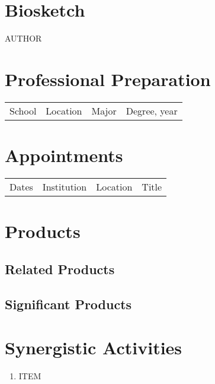 \documentclass[fontsize=10pt,paper=letter,twoside=false,onecolumn,headings=small]{scrartcl} %
\begin{document}
\section*{Biosketch}
{\Large\textsc{AUTHOR}}
\section*{Professional Preparation}
\begin{tabular}{llll}
School & Location & Major & Degree, year \\
\end{tabular}
\section*{Appointments}
\begin{tabular}{llll}
	Dates & Institution & Location & Title 
\end{tabular}
\section*{Products}
\subsection*{Related Products}
\begin{refsection}
\nocite{}
\printbibliography[heading=none]
\end{refsection}
\subsection*{Significant Products}
\begin{refsection}
\nocite{}
\printbibliography[heading=none]
\end{refsection}
\section*{Synergistic Activities}
\begin{enumerate}
	\item ITEM
\end{enumerate}
\end{document}
